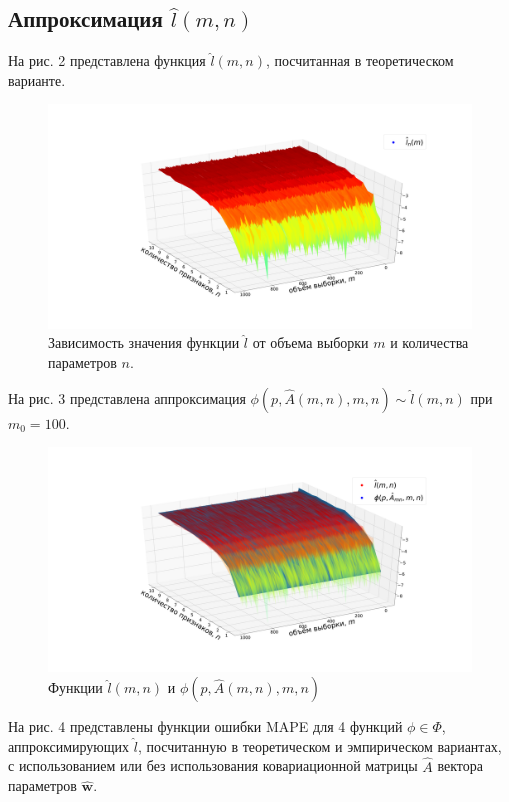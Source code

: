 \documentclass[12pt,twoside]{article}
\begin{document}
\subsection{Аппроксимация $\hat{l}(m, n)$}

На рис. 2 представлена функция $\hat{l}(m, n)$, посчитанная в теоретическом варианте.

\begin{figure}[h!t]\center
\includegraphics[width=1\textwidth]{../data/pics/adequate_random_sample_llh.pdf}
\caption{Зависимость значения функции $\hat{l}$ от объема выборки $m$ и количества параметров $n$.}
\label{fig1.5}
\end{figure}

На рис. 3 представлена аппроксимация $\phi(p, \hat{A}(m, n), m, n) \sim \hat{l}(m, n)$ при $m_0 = 100$.

\begin{figure}[h!t]\center
\includegraphics[width=1\textwidth]{../data/pics/adequate_random_sample_llh_phi.pdf}
\caption{Функции $\hat{l}(m, n)$ и $\phi(p, \hat{A}(m, n), m, n)$}
\label{fig1.7}
\end{figure}

На рис. 4 представлены функции ошибки MAPE для 4 функций $\phi \in \Phi$, аппроксимирующих $\hat{l}$, посчитанную в теоретическом и эмпирическом вариантах, с использованием или без использования ковариационной матрицы $\hat{A}$ вектора параметров $\hat{\mathbf{w}}$.
\end{document}
